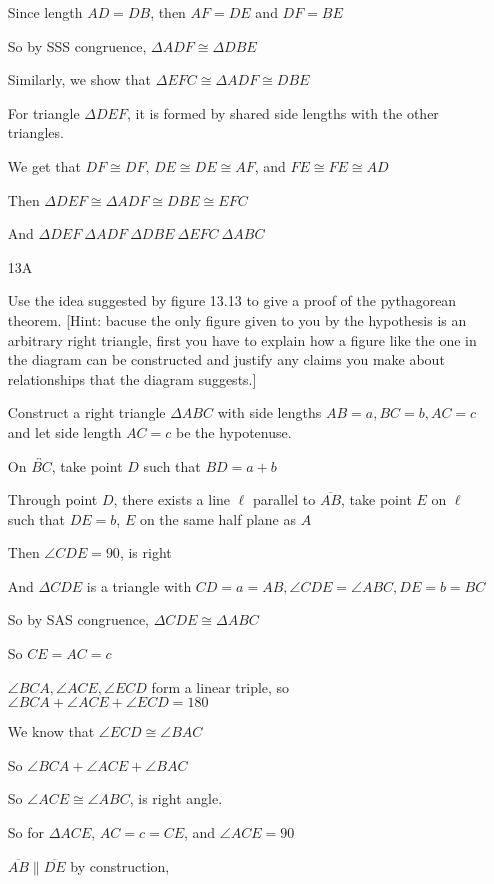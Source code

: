 \documentclass[11pt]{article}
\newcommand{\lines}[1]{\overleftrightarrow{#1}}
\newcommand{\segment}[1]{\overline{#1}}
\begin{document}
\begin{itemize}
		Since length $AD = DB$, then $AF = DE$ and $DF = BE$

		So by SSS congruence, $\Delta ADF \cong \Delta DBE$

		Similarly, we show that $\Delta EFC \cong \Delta ADF \cong DBE$

		For triangle $\Delta DEF$, it is formed by shared side lengths with the other triangles.

		We get that $DF \cong DF$, $DE \cong DE \cong AF$, and $FE \cong FE \cong AD$

		Then $\Delta DEF \cong \Delta ADF \cong DBE \cong EFC$

		And $\Delta DEF ~ \Delta ADF ~ \Delta DBE ~ \Delta EFC ~ \Delta ABC$

	\item[13A]

		Use the idea suggested by figure 13.13 to give a proof of the pythagorean theorem. [Hint: bacuse the only figure given to you by the hypothesis is an arbitrary right triangle, first you have to explain how a figure like the one in the diagram can be constructed and justify any claims you make about relationships that the diagram suggests.] 

		Construct a right triangle $\Delta ABC$ with side lengths $AB = a, BC = b, AC = c$ and let side length $AC = c$ be the hypotenuse.

		On $\lines{BC}$, take point $D$ such that $BD = a + b$

		Through point $D$, there exists a line $\ell$ parallel to $\segment{AB}$, take point $E$ on $\ell$ such that $DE = b$, $E$ on the same half plane as $A$

		Then $\angle CDE = 90$, is right

		And $\Delta CDE$ is a triangle with $CD = a = AB, \angle CDE = \angle ABC, DE = b = BC$

		So by SAS congruence, $\Delta CDE \cong \Delta ABC$

		So $CE = AC = c$

		$\angle BCA, \angle ACE, \angle ECD$ form a linear triple, so $\angle BCA + \angle ACE + \angle ECD = 180$

		We know that $\angle ECD \cong \angle BAC$

		So $\angle BCA + \angle ACE + \angle BAC$

		So $\angle ACE \cong \angle ABC$, is right angle.

		So for $\Delta ACE$, $AC = c = CE$, and $\angle ACE = 90$

		$\segment{AB} \parallel \segment{DE}$ by construction, 


\end{itemize}
\end{document}
